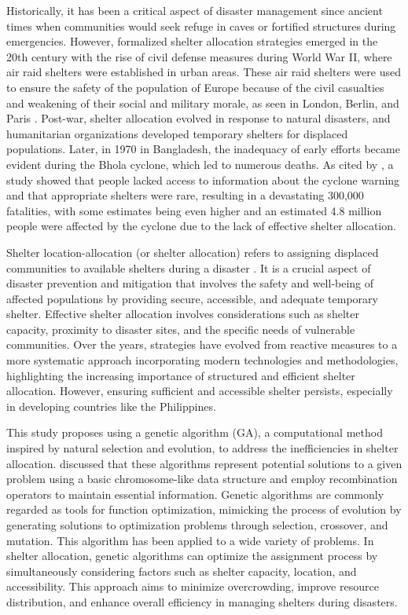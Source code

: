 	Historically, it has been a critical aspect of disaster management since ancient times when communities would seek refuge in caves or fortified structures during emergencies. However, formalized shelter allocation strategies emerged in the 20th century with the rise of civil defense measures during World War II, where air raid shelters were established in urban areas. These air raid shelters were used to ensure the safety of the population of Europe because of the civil casualties and weakening of their social and military morale, as seen in London, Berlin, and Paris \parencite{Flebus1941,Shakibamaesh2015}. Post-war, shelter allocation evolved in response to natural disasters, and humanitarian organizations developed temporary shelters for displaced populations. Later, in 1970 in Bangladesh, the inadequacy of early efforts became evident during the Bhola cyclone, which led to numerous deaths. As cited by \textcite{Hossain2018}, a study showed that people lacked access to information about the cyclone warning and that appropriate shelters were rare, resulting in a devastating 300,000 fatalities, with some estimates being even higher and an estimated 4.8 million people were affected by the cyclone due to the lack of effective shelter allocation.
	
	Shelter location-allocation (or shelter allocation) refers to assigning displaced communities to available shelters during a disaster \parencite{Yin2023}. It is a crucial aspect of disaster prevention and mitigation that involves the safety and well-being of affected populations by providing secure, accessible, and adequate temporary shelter. Effective shelter allocation involves considerations such as shelter capacity, proximity to disaster sites, and the specific needs of vulnerable communities. Over the years, strategies have evolved from reactive measures to a more systematic approach incorporating modern technologies and methodologies, highlighting the increasing importance of structured and efficient shelter allocation. However, ensuring sufficient and accessible shelter persists, especially in developing countries like the Philippines.
	
	This study proposes using a genetic algorithm (GA), a computational method inspired by natural selection and evolution, to address the inefficiencies in shelter allocation. \textcite{Mathew2012} discussed that these algorithms represent potential solutions to a given problem using a basic chromosome-like data structure and employ recombination operators to maintain essential information. Genetic algorithms are commonly regarded as tools for function optimization, mimicking the process of evolution by generating solutions to optimization problems through selection, crossover, and mutation. This algorithm has been applied to a wide variety of problems. In shelter allocation, genetic algorithms can optimize the assignment process by simultaneously considering factors such as shelter capacity, location, and accessibility. This approach aims to minimize overcrowding, improve resource distribution, and enhance overall efficiency in managing shelters during disasters.
	
